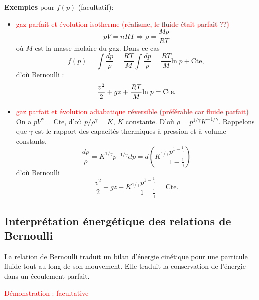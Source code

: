 \documentclass[11pt,a4paper]{report}
\begin{document}
\textbf{Exemples} pour $f(p)$ (facultatif):
\begin{itemize}
	\item \textcolor{red}{gaz parfait et évolution isotherme (réalisme, le fluide était parfait ??)}
	\begin{equation}
		pV = nRT \Rightarrow \rho = \frac{Mp}{RT}
	\end{equation}
	où $M$ est la masse molaire du gaz. Dans ce cas
	\begin{equation}
		f(p) = \int \frac{dp}{\rho} = \frac{RT}{M}\int \frac{dp}{p} = \frac{RT}{M}\text{ln}\;p + \text{Cte},
	\end{equation}
	d'où Bernoulli :
	\begin{equation}
		\frac{v^2}{2} + gz + \frac{RT}{M}\text{ln}\;p = \text{Cte}.\\
	\end{equation}
	
	\item \textcolor{red}{gaz parfait et évolution adiabatique réversible (préférable car fluide parfait)}\\
	On a $pV^{\gamma} = \text{Cte}$, d'où $p/\rho^\gamma = K$, $K$ constante. D'où $\rho = p^{1/\gamma}K^{-1/\gamma}$. Rappelons que $\gamma$ est le rapport des capacités thermiques à pression et à volume constants. 
	\begin{equation}
		\frac{dp}{\rho} = K^{1/\gamma} p^{-1/\gamma} dp = d\left(K^{1/\gamma}\frac{p^{1-\frac{1}{\gamma}}}{1-\frac{1}{\gamma}}\right)
	\end{equation}
	d'où Bernoulli
	\begin{equation}
		\frac{v^2}{2} + gz + K^{1/\gamma}\frac{p^{1-\frac{1}{\gamma}}}{1-\frac{1}{\gamma}} = \text{Cte}.
	\end{equation}
\end{itemize}


\subsection{Interprétation énergétique des relations de Bernoulli}

La relation de Bernoulli traduit un bilan d'énergie cinétique pour une particule fluide tout au long de son mouvement. Elle traduit la conservation de l'énergie dans un écoulement parfait.

\textcolor{red}{Démonstration : facultative}
\end{document}
